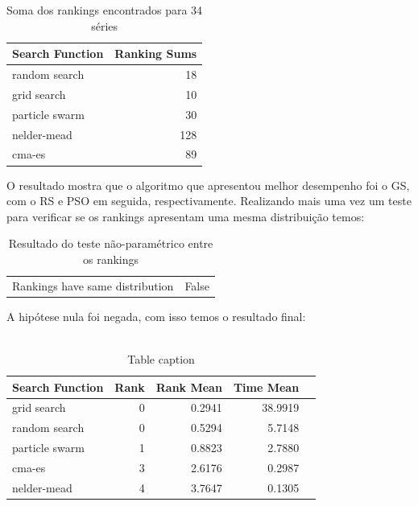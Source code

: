 \documentclass[preprint,12pt]{elsarticle}
\begin{document}
\begin{table}[h]
	\centering
	\begin{tabular}{lr}
		\hline
		Search Function   &   Ranking Sums \\
		\hline
		random search     &             18 \\
		grid search       &             10 \\
		particle swarm    &             30 \\
		nelder-mead       &            128 \\
		cma-es            &             89 \\
		\hline
	\end{tabular}
	
	\caption{Soma dos rankings encontrados para 34 séries}
\end{table}

O resultado mostra que o algoritmo que apresentou melhor desempenho foi o GS, com o RS e PSO em seguida, respectivamente. Realizando mais uma vez um teste para verificar se os rankings apresentam uma mesma distribuição temos:

\begin{table}[h]
	\centering
	\begin{tabular}{l r}
		
		Rankings have same distribution  &  False \\
		
	\end{tabular}
	\caption{Resultado do teste não-paramétrico entre os rankings}
\end{table}

A hipótese nula foi negada, com isso temos o resultado final:\\ \\

\begin{table}[h]
	\centering
	\begin{tabular}{lrrrr}
		\hline
		Search Function   &   Rank &   Rank Mean &     Time Mean \\
		\hline
		grid search       &      0 &    0.2941 &       38.9919   \\
		random search     &      0 &    0.5294 &         5.7148   \\
		particle swarm    &      1 &    0.8823 &         2.7880  \\
		cma-es            &      3 &    2.6176  &   0.2987 \\
		nelder-mead       &      4 &    3.7647  &        0.1305 \\
		\hline
	\end{tabular}
	
	
	\caption{Table caption}
\end{table}
\end{document}
